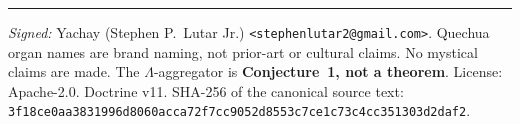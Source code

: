 \documentclass[11pt]{article}
\theoremstyle{plain}
\theoremstyle{definition}
\theoremstyle{remark}
\newcommand{\La}{\Lambda}
\begin{document}
\vspace{1em}\hrule\vspace{0.5em}
\noindent\small\textit{Signed:} Yachay (Stephen P.\ Lutar Jr.)
\texttt{<stephenlutar2@gmail.com>}. Quechua organ names are brand naming, not prior-art or
cultural claims. No mystical claims are made. The $\La$-aggregator is \textbf{Conjecture~1,
not a theorem}. License: Apache-2.0. Doctrine v11. SHA-256 of the canonical source text:
\texttt{3f18ce0aa3831996d8060acca72f7cc9052d8553c7ce1c73c4cc351303d2daf2}.\normalsize
\end{document}
